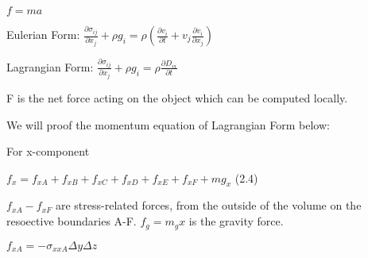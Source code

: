 $f=ma$

Eulerian Form: $\frac{\partial \sigma_{ij}}{\partial x_j}+\rho g_i = \rho (\frac{\partial v_i}{\partial t}+v_j\frac{\partial v_i}{\partial x_j})$

Lagrangian Form: $\frac{\partial \sigma_{ij}}{\partial x_j}+\rho g_i = \rho \frac{\partial D_{vi}}{\partial t}$

F is the net force acting on the object which can be computed locally. 

We will proof the momentum equation of Lagrangian Form below:

For x-component

$f_x=f_{xA}+f_{xB}+f_{xC}+f_{xD}+f_{xE}+f_{xF}+mg_x$ (2.4)

$f_{xA}- f_{xF}$ are stress-related forces, from the outside of the volume on the resoective boundaries A-F. 
$f_g=m_gx$ is the gravity force.

$f_{xA} = -\sigma_{xxA}\Delta y\Delta z$


